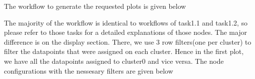 \documentclass[11pt]{article}
\begin{document}
			
			The workflow to generate the requested plots is given below

			The majority of the workflow is identical to workflows of task1.1 and task1.2, so please refer to those tasks for a detailed explanations of those nodes. The major difference is on the display section. There, we use 3 row filters(one per cluster) to filter the datapoints that were assigned on each cluster. Hence in the first plot, we have all the datapoints assigned to cluster0 and vice versa. The node configurations with the nessesary filters are given below
			\iffalse
\end{document}

